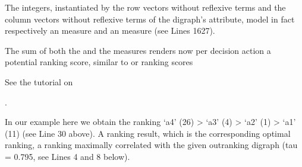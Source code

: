\documentclass[a4paper,12pt,english]{sphinxhowto}
\begin{document}
\sphinxAtStartPar
The  integers, instantiated by the row vectors without reflexive terms  and the column vectors without reflexive terms of the digraph’s  attribute, model in fact respectively an  measure  and an  measure  (see Lines 16\sphinxhyphen{}27).

\sphinxAtStartPar
The sum  of both the  and the  measures renders now per decision action  a potential ranking score, similar to  or  ranking scores %
\begin{footnote}[21]\sphinxAtStartFootnote
See the tutorial on 
%
\end{footnote}.

\sphinxAtStartPar
In our example here we obtain the  ranking ‘a4’ (26) \textgreater{} ‘a3’ (4) \textgreater{} ‘a2’ (1) \textgreater{} ‘a1’ (\sphinxhyphen{}11) (see Line 30 above). A ranking result, which is the corresponding optimal  ranking, a ranking  maximally correlated with the given outranking digraph  (tau = 0.795, see Lines 4 and 8 below).

%
\begin{sphinxVerbatim}[commandchars=\\\{\},numbers=left,firstnumber=1,stepnumber=1]
 
  
  \PYG{p}{[}\PYG{p}{]}
\end{sphinxVerbatim}
\sphinxresetverbatimhllines
\end{document}
